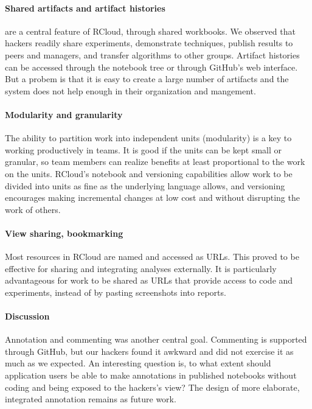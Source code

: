 \paragraph*{Shared artifacts and artifact histories} are a central feature
of RCloud, through shared workbooks. We observed that hackers readily
share experiments, demonstrate techniques, publish results to peers and
managers, and transfer algorithms to other groups. Artifact histories
can be accessed through the notebook tree or through GitHub's web interface.
But a probem is that it is easy to create a large number of artifacts
and the system does not help enough in their organization and mangement.

\paragraph*{Modularity and granularity} The ability to partition work into
independent units (modularity) is a key to working productively in teams.
It is good if the units can be kept small or granular, so team members can
realize benefits at least proportional to the work on the units.
RCloud's notebook and versioning capabilities allow work to be divided
into units as fine as the underlying language allows, and versioning
encourages making incremental changes at low cost and without disrupting
the work of others.

\paragraph*{View sharing, bookmarking} Most resources in RCloud are named
and accessed as URLs. This proved to be effective for sharing and integrating
analyses externally. It is particularly advantageous for work to be shared
as URLs that provide access to code and experiments, instead of by pasting
screenshots into reports.

\paragraph*{Discussion} Annotation and commenting was another central goal.
Commenting is supported through GitHub, but our hackers found it
awkward and did not exercise it as much as we expected.
An interesting question is, to what extent should application users
be able to make annotations in published notebooks without coding
and being exposed to the hackers's view? The design of
more elaborate, integrated annotation remains as future work.

